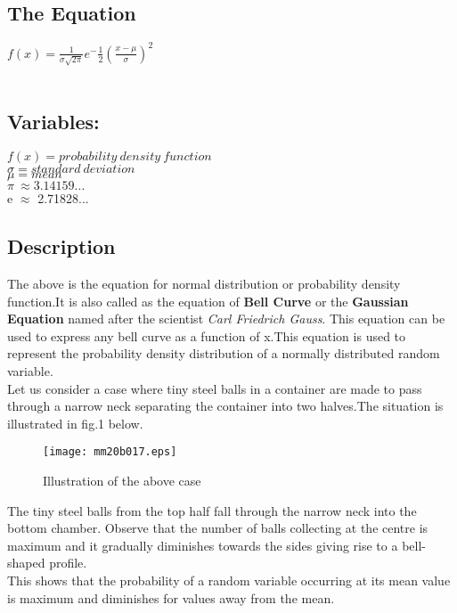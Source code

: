 \subsection{The Equation}

{\huge $f(x)= \frac{1}{\sigma \sqrt{2\pi}} e^-\frac{1}{2}(\frac{x-\mu}{\sigma})^2$}
 \\
\\\subsection{Variables:}
$f(x) = probability \ density \ function$
 \\ $\sigma = standard \ deviation $
 \\$ \mu = mean$
 \\ $\pi \ \approx 3.14159... $
 \\ e $\approx$ 2.71828...
 \subsection{Description}
 The above is the equation for normal distribution or probability density function.It is also called as the equation of \textbf {Bell Curve} or the \textbf{Gaussian Equation} named after the scientist {\emph{Carl Friedrich Gauss}}. This equation can be used to express any bell curve as a function of x.This equation is used to represent the probability density distribution of a normally distributed random variable.
 \\Let us consider a case where tiny steel balls in a container are made to pass through a narrow neck separating the container into two halves.The situation is illustrated in fig.1 below. \\
 
 \begin{figure}[htbp]
    \centerline{\texttt{[image: mm20b017.eps]}}
    \caption{Illustration of the above case}
    \label{fig:mesh1}
\end{figure}

The tiny steel balls from the top half fall through the narrow neck into the bottom chamber. Observe that the number of balls collecting at the centre is maximum and it gradually diminishes towards the sides giving rise to a bell-shaped profile.
 \\ This shows that the probability of a random variable occurring at its mean value is maximum and diminishes for values away from the mean.
 \cite{enwiki:1026848272}
 \cite{article}

